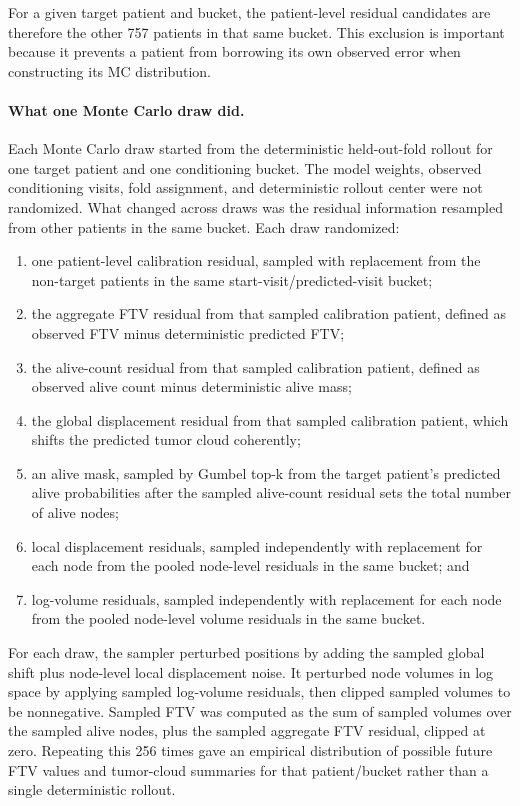 \documentclass[11pt]{article}
\begin{document}
For a given target patient and bucket, the patient-level residual candidates are
therefore the other 757 patients in that same bucket. This exclusion is
important because it prevents a patient from borrowing its own observed error
when constructing its MC distribution.

\paragraph{What one Monte Carlo draw did.}
Each Monte Carlo draw started from the deterministic held-out-fold rollout for
one target patient and one conditioning bucket. The model weights, observed
conditioning visits, fold assignment, and deterministic rollout center were not
randomized. What changed across draws was the residual information resampled
from other patients in the same bucket. Each draw randomized:
\begin{enumerate}
    \item one patient-level calibration residual, sampled with replacement from
    the non-target patients in the same start-visit/predicted-visit bucket;
    \item the aggregate FTV residual from that sampled calibration patient,
    defined as observed FTV minus deterministic predicted FTV;
    \item the alive-count residual from that sampled calibration patient,
    defined as observed alive count minus deterministic alive mass;
    \item the global displacement residual from that sampled calibration
    patient, which shifts the predicted tumor cloud coherently;
    \item an alive mask, sampled by Gumbel top-k from the target patient's
    predicted alive probabilities after the sampled alive-count residual sets
    the total number of alive nodes;
    \item local displacement residuals, sampled independently with replacement
    for each node from the pooled node-level residuals in the same bucket; and
    \item log-volume residuals, sampled independently with replacement for each
    node from the pooled node-level volume residuals in the same bucket.
\end{enumerate}

For each draw, the sampler perturbed positions by adding the sampled global
shift plus node-level local displacement noise. It perturbed node volumes in
log space by applying sampled log-volume residuals, then clipped sampled volumes
to be nonnegative. Sampled FTV was computed as the sum of sampled volumes over
the sampled alive nodes, plus the sampled aggregate FTV residual, clipped at
zero. Repeating this 256 times gave an empirical distribution of possible
future FTV values and tumor-cloud summaries for that patient/bucket rather than
a single deterministic rollout.
\end{document}
